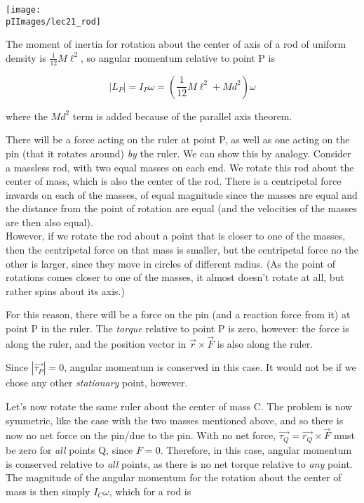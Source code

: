 \begin{center}
\texttt{[image: \\pIImages/lec21\_rod]}
\end{center}

The moment of inertia for rotation about the center of axis of a rod of uniform density is $\displaystyle \frac{1}{12} M \ell^2$, so angular momentum relative to point P is

\begin{equation}
|L_P| = I_P \omega = \left(\frac{1}{12} M \ell^2 + M d^2\right) \omega
\end{equation}

where the $M d^2$ term is added because of the parallel axis theorem.

There will be a force acting on the ruler at point P, as well as one acting on the pin (that it rotates around) \emph{by} the ruler. We can show this by analogy. Consider a massless rod, with two equal masses on each end. We rotate this rod about the center of mass, which is also the center of the rod. There is a centripetal force inwards on each of the masses, of equal magnitude since the masses are equal and the distance from the point of rotation are equal (and the velocities of the masses are then also equal).\\
However, if we rotate the rod about a point that is closer to one of the masses, then the centripetal force on that mass is smaller, but the centripetal force no the other is larger, since they move in circles of different radius. (As the point of rotations comes closer to one of the masses, it almost doesn't rotate at all, but rather spins about its axis.)

For this reason, there will be a force on the pin (and a reaction force from it) at point P in the ruler. The \emph{torque} relative to point P is zero, however: the force is along the ruler, and the position vector in $\vec{r} \times \vec{F}$ is also along the ruler.

Since $|\vec{\tau_P}| = 0$, angular momentum is conserved in this case. It would not be if we chose any other \emph{stationary} point, however.

Let's now rotate the same ruler about the center of mass C. The problem is now symmetric, like the case with the two masses mentioned above, and so there is now no net force on the pin/due to the pin. With no net force, $\vec{\tau_Q} = \vec{r_Q} \times \vec{F}$ must be zero for \emph{all} points Q, since $F = 0$. Therefore, in this case, angular momentum is conserved relative to \emph{all} points, as there is no net torque relative to \emph{any} point. The magnitude of the angular momentum for the rotation about the center of mass is then simply $I_C \omega$, which for a rod is

